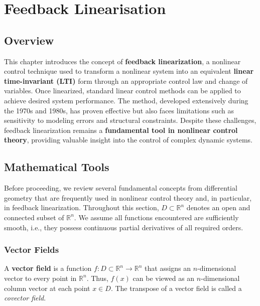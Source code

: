 \chapterspaceabove{6.75cm} %
\chapterspacebelow{7.25cm} %

\chapter{Feedback Linearisation}
\section{Overview}
This chapter introduces the concept of \textbf{feedback linearization}, a nonlinear control technique used to transform a nonlinear system into an equivalent \textbf{linear time-invariant (LTI)} form through an appropriate control law and change of variables. Once linearized, standard linear control methods can be applied to achieve desired system performance. The method, developed extensively during the 1970s and 1980s, has proven effective but also faces limitations such as sensitivity to modeling errors and structural constraints. Despite these challenges, feedback linearization remains a \textbf{fundamental tool in nonlinear control theory}, providing valuable insight into the control of complex dynamic systems.

\section{Mathematical Tools}

Before proceeding, we review several fundamental concepts from differential geometry that 
are frequently used in nonlinear control theory and, in particular, in feedback linearization.  
Throughout this section, $D \subset \mathbb{R}^n$ denotes an open and connected subset of $\mathbb{R}^n$.  
We assume all functions encountered are sufficiently smooth, i.e., they possess continuous 
partial derivatives of all required orders.

\subsection{Vector Fields}

A \textbf{vector field} is a function $f : D \subset \mathbb{R}^n \to \mathbb{R}^n$ that assigns an 
$n$-dimensional vector to every point in $\mathbb{R}^n$.  
Thus, $f(x)$ can be viewed as an $n$-dimensional column vector at each point $x \in D$.  
The transpose of a vector field is called a \emph{covector field}.  

